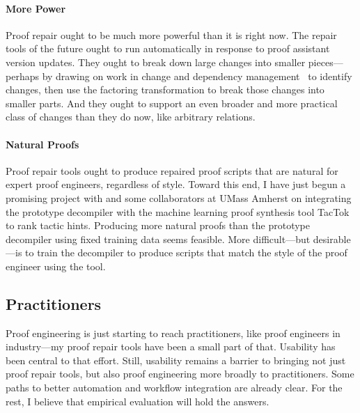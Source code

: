 \paragraph{More Power} 
Proof repair ought to be much more powerful than it is right now.
The repair tools of the future ought to run automatically in response to proof assistant version updates.
They ought to break down large changes into smaller pieces---perhaps by drawing on work in change and 
dependency management~\cite{873647, Autexier:2010:CMH:1986659.1986663, Celik:2017:IRP:3155562.3155588} to identify changes, then use the factoring transformation
to break those changes into smaller parts.
And they ought to support an even broader and more practical class of changes than they do now,
like arbitrary relations.

\paragraph{Natural Proofs}
Proof repair tools ought to produce repaired proof scripts that are natural for expert proof engineers,
regardless of style.
Toward this end, I have just begun a promising project with  and some collaborators at UMass Amherst
on integrating the prototype decompiler with the machine learning proof synthesis tool TacTok~\cite{10.1145/3428299} to rank tactic hints.
Producing more natural proofs than the prototype decompiler using fixed training data seems feasible.
More difficult---but desirable---is to train the decompiler to produce scripts that match the style of the proof engineer using the tool.

\subsection*{Practitioners}

Proof engineering is just starting to reach practitioners, like proof engineers in industry---my proof repair tools have been a small part of that.
Usability has been central to that effort.
Still, usability remains a barrier to bringing not just proof repair tools, but also proof engineering 
more broadly to practitioners.
Some paths to better automation and workflow integration are already clear.
For the rest, I believe that empirical evaluation will hold the answers.

